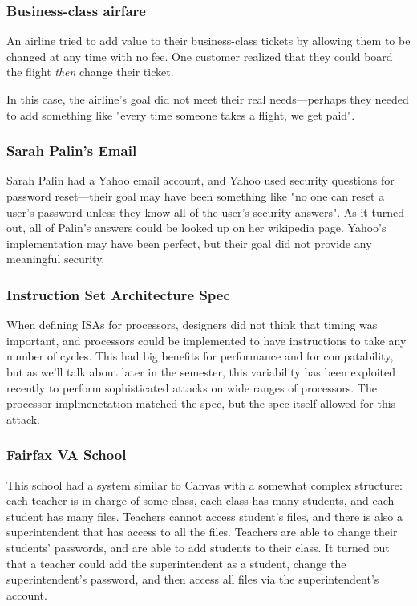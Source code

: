 \subsubsection{Business-class airfare}
An airline tried to add value to their business-class tickets by allowing them to be changed at any time with no fee. One customer realized that they could board the flight \textit{then} change their ticket.

In this case, the airline's goal did not meet their real needs---perhaps they needed to add something like "every time someone takes a flight, we get paid".

\subsubsection{Sarah Palin's Email}
Sarah Palin had a Yahoo email account, and Yahoo used security questions for password reset---their goal may have been something like "no one can reset a user's password unless they know all of the user's security answers". As it turned out, all of Palin's answers could be looked up on her wikipedia page. Yahoo's implementation may have been perfect, but their goal did not provide any meaningful security.

\subsubsection{Instruction Set Architecture Spec}
When defining ISAs for processors, designers did not think that timing was important, and processors could be implemented to have instructions to take any number of cycles. This had big benefits for performance and for compatability, but as we'll talk about later in the semester, this variability has been exploited recently to perform sophisticated attacks on wide ranges of processors. The processor implmenetation matched the spec, but the spec itself allowed for this attack.

\subsubsection{Fairfax VA School}
This school had a system similar to Canvas with a somewhat complex structure: each teacher is in charge of some class, each class has many students, and each student has many files. Teachers cannot access student's files, and there is also a superintendent that has access to all the files. Teachers are able to change their students' passwords, and are able to add students to their class. It turned out that a teacher could add the superintendent as a student, change the superintendent's password, and then access all files via the superintendent's account.

